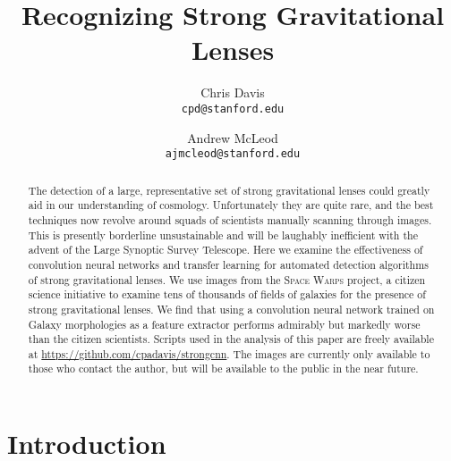\documentclass[10pt,twocolumn,letterpaper]{article}
\begin{document}
\title{Recognizing Strong Gravitational Lenses}

\author{Chris Davis\\
{\tt\small cpd@stanford.edu}
\and
Andrew McLeod\\
{\tt\small ajmcleod@stanford.edu}
}

\maketitle

\begin{abstract}
    The detection of a large, representative set of strong gravitational lenses
    could greatly aid in our understanding of cosmology. Unfortunately they are
    quite rare, and the best techniques now revolve around squads of scientists
    manually scanning through images. This is presently borderline
    unsustainable and will be laughably inefficient with the advent of the
    Large Synoptic Survey Telescope. Here we examine the effectiveness of
    convolution neural networks and transfer learning for automated detection
    algorithms of strong gravitational lenses. We use images from the
    \textsc{Space Warps} project, a citizen science initiative to examine tens
    of thousands of fields of galaxies for the presence of strong gravitational
    lenses. 
    We find that using a convolution neural network trained on Galaxy
    morphologies as a feature extractor performs admirably but markedly worse
    than the citizen scientists.
    Scripts used in the analysis of this paper are freely available at
    \url{https://github.com/cpadavis/strongcnn}. The images are currently only
    available to those who contact the author, but will be available to the
    public in the near future.
\end{abstract}

\section{Introduction}

\end{document}
